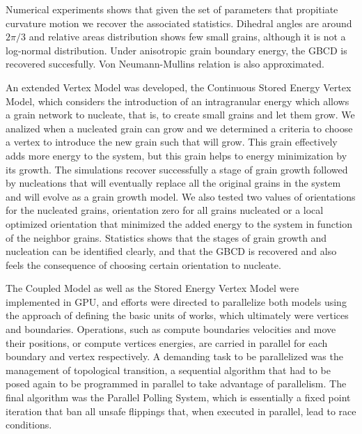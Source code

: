 Numerical experiments shows that given the set of parameters that propitiate curvature motion we recover the associated statistics. 
Dihedral angles are around $2\pi/3$ and relative areas distribution shows few small grains, although it is not a log-normal distribution. 
Under anisotropic grain boundary energy, the GBCD is recovered succesfully. 
Von Neumann-Mullins relation is also approximated.

An extended Vertex Model was developed, the Continuous Stored Energy Vertex Model, which considers the introduction of an intragranular energy which allows a grain network to nucleate, that is, to create small grains and let them grow.
We analized when a nucleated grain can grow and we determined a criteria to choose a vertex to introduce the new grain such that will grow. This grain effectively adds more energy to the system, but this grain helps to energy minimization by its growth. The simulations recover successfully a stage of grain growth followed by nucleations that will eventually replace all the original grains in the system and will evolve as a grain growth model. We also tested two values of orientations for the nucleated grains, orientation zero for all grains nucleated or a local optimized orientation that minimized the added energy to the system in function of the neighbor grains. Statistics shows that the stages of grain growth and nucleation can be identified clearly, and that the GBCD is recovered and also feels the consequence of choosing certain orientation to nucleate.

The Coupled Model as well as the Stored Energy Vertex Model were implemented in GPU, and efforts were directed to parallelize both models using the approach of defining the basic units of works, which ultimately were vertices and boundaries. 
Operations, such as compute boundaries velocities and move their positions, or compute vertices energies, are carried in parallel for each boundary and vertex respectively. 
A demanding task to be parallelized was the management of topological transition, a sequential algorithm that had to be posed again to be programmed in parallel to take advantage of parallelism. 
The final algorithm was the Parallel Polling System, which is essentially a fixed point iteration that ban all unsafe flippings that, when executed in parallel, lead to race conditions.

